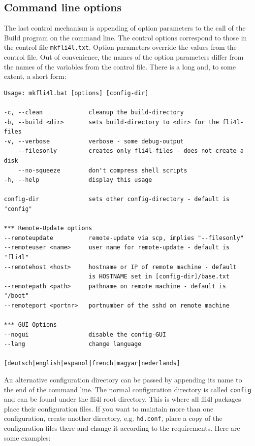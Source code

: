  \subsection{Command line options}
  The last control mechanism is appending of option parameters to the call of the Build program
  on the command line. The control options correspond to those in the control file \texttt{mkfli4l.txt}. 
  Option parameters override the values from the control file.
  Out of convenience, the names of the option parameters differ from the names of
  the variables from the control file. There is a long and, to some extent, a
  short form:

  \begin{verbatim}
Usage: mkfli4l.bat [options] [config-dir]

-c, --clean             cleanup the build-directory
-b, --build <dir>       sets build-directory to <dir> for the fli4l-files
-v, --verbose           verbose - some debug-output
    --filesonly         creates only fli4l-files - does not create a disk
    --no-squeeze        don't compress shell scripts
-h, --help              display this usage

config-dir              sets other config-directory - default is "config"

*** Remote-Update options
--remoteupdate          remote-update via scp, implies "--filesonly"
--remoteuser <name>     user name for remote-update - default is "fli4l"
--remotehost <host>     hostname or IP of remote machine - default
                        is HOSTNAME set in [config-dir]/base.txt
--remotepath <path>     pathname on remote machine - default is "/boot"
--remoteport <portnr>   portnumber of the sshd on remote machine

*** GUI-Options
--nogui                 disable the config-GUI
--lang                  change language
                        [deutsch|english|espanol|french|magyar|nederlands]

  \end{verbatim}

  An alternative configuration directory can be passed by appending its name to the end of the command line.
  The normal configuration directory is called \texttt{config} and can be found under the fli4l
  root directory. This is where all fli4l packages place their configuration files.
  If you want to maintain more than one configuration, create another directory, e.g. \texttt{hd.conf},
  place a copy of the configuration files there and change it according to the requirements.
  Here are some examples:


